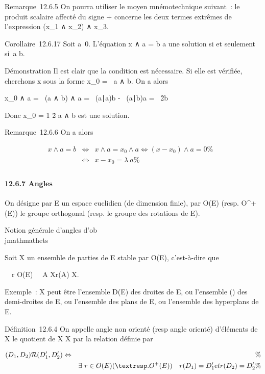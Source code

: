 \documentclass[]{article}
\begin{document}
Remarque~12.6.5 On pourra utiliser le moyen mnémotechnique suivant~: le
produit scalaire affecté du signe + concerne les deux termes extrêmes de
l'expression (x_1 ∧ x_2) ∧ x_3.

Corollaire~12.6.17 Soit a\neq~0. L'équation x ∧ a
= b a une solution si et seulement si~a \bot b.

Démonstration Il est clair que la condition est nécessaire. Si elle est
vérifiée, cherchons x sous la forme x_0 = \lambda~a ∧ b. On a alors

x_0 ∧ a = \lambda~(a ∧ b) ∧ a = \lambda~(a∣a)b -
\lambda~(a∣b)a =
\lambda~\a\^2b

Donc x_0 = 1 \over
\a\^2 a ∧
b est une solution.

Remarque~12.6.6 On a alors

\begin{align*} x ∧ a = b&
\Leftrightarrow & x ∧ a = x_0 ∧ a
\Leftrightarrow (x - x_0) ∧ a = 0\%&
\\ & \Leftrightarrow & x -
x_0 = \lambda~a \%& \\
\end{align*}

\paragraph{12.6.7 Angles}

On désigne par E un espace euclidien (de dimension finie), par O(E)
(resp. O^+(E)) le groupe orthogonal (resp. le groupe des
rotations de E).

Notion générale d'angles d'ob\\jmathmathets

Soit X un ensemble de parties de E stable par O(E), c'est-à-dire que

\forall~~r \in O(E)\quad
\forall~~A \in X\quad r(A) \in X.

Exemple~: X peut être l'ensemble D(E) des droites de E, ou l'ensemble
\tildeD() des demi-droites de E, ou l'ensemble des
plans de E, ou l'ensemble des hyperplans de E.

Définition~12.6.4 On appelle angle non orienté (resp angle orienté)
d'éléments de X le quotient de X \times X par la relation  définie par

\begin{align*}
(D_1,D_2)\mathcal{R}(D_1',D_2')
\Leftrightarrow&& \%& \\
& & \exists~r \in O(E) (\textresp.
O^+(E))\quad r(D_ 1) =
D_1'\text et r(D_2) =
D_2'\%& \\
\end{align*}
\end{document}
